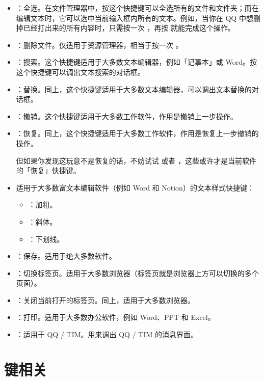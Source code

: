\begin{itemize}
  \item {}：全选。在文件管理器中，按这个快捷键可以全选所有的文件和文件夹；而在编辑文本时，它可以选中当前输入框内所有的文本。例如，当你在 QQ 中想删掉已经打出来的所有内容时，只需按一次 ，再按  就能完成这个操作。
  \item {}：删除文件。仅适用于资源管理器，相当于按一次 。
  \item {}：搜索。这个快捷键适用于大多数文本编辑器，例如「记事本」或 Word。按这个快捷键可以调出文本搜索的对话框。
  \item {}：替换。同上，这个快捷键适用于大多数文本编辑器，可以调出文本替换的对话框。
  \item {}：撤销。这个快捷键适用于大多数工作软件，作用是撤销上一步操作。
  \item {}：恢复。同上，这个快捷键适用于大多数工作软件，作用是恢复上一步撤销的操作。
  
  但如果你发现这玩意不是恢复的话，不妨试试  或者 ，这些或许才是当前软件的「恢复」快捷键。

  \item 适用于大多数富文本编辑软件（例如 Word 和 Notion）的文本样式快捷键：
  \begin{itemize}
    \item {}：加粗。
    \item {}：斜体。
    \item {}：下划线。
  \end{itemize}
  \item {}：保存。适用于绝大多数软件。
  \item {}：切换标签页。适用于大多数浏览器（标签页就是浏览器上方可以切换的多个页面）。
  \item {}：关闭当前打开的标签页。同上，适用于大多数浏览器。
  \item {}：打印。适用于大多数办公软件，例如 Word、PPT 和 Excel。
  \item {}：适用于 QQ / TIM。用来调出 QQ / TIM 的消息界面。
\end{itemize}

\section{ 键相关}

